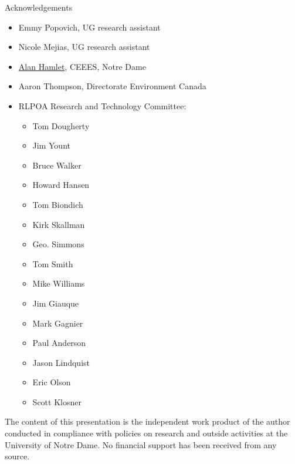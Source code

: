 \documentclass[compress,english]{beamer}
\begin{document}
\begin{frame}{Acknowledgements}
\begin{small}
\begin{itemize}
\item Emmy Popovich, UG research assistant
\item Nicole Mejias, UG research assistant
\item \href{http://engineering.nd.edu/profiles/ahamlet/}{Alan Hamlet}, CEEES, Notre Dame
\item Aaron Thompson, Directorate Environment Canada
\item RLPOA Research and Technology Committee:
\begin{multicols}{3}
\begin{itemize}
\item Tom Dougherty
\item Jim Yount
\item Bruce Walker
\item Howard Hansen
\item Tom Biondich
\item Kirk Skallman
\item Geo. Simmons
\item Tom Smith
\item Mike Williams
\item Jim Giauque
\item Mark Gagnier
\item Paul Anderson
\item Jason Lindquist
\item Eric Olson
\item Scott Klosner
\end{itemize}
\end{multicols}
\end{itemize}
\end{small}

\begin{footnotesize}
The content of this presentation is the independent work product of the author conducted in compliance with policies on research and outside activities at the University of Notre Dame. No financial support has been received from any source.
\end{footnotesize}

\end{frame}

\end{document}

